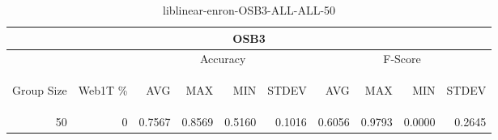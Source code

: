 \begin{center}
\begin{table}[htbp]
\begin{tabular}{ | r | r | r | r | r | r | r | r | r | r |}
\hline
\multicolumn{10}{|c|}{OSB3}\\
\hline
 & & \multicolumn{4}{|c|}{Accuracy} & \multicolumn{4}{|c|}{F-Score}\\ \cline{3-10}
\begin{sideways}Group Size\end{sideways} & \begin{sideways}Web1T \%\end{sideways} & \begin{sideways}AVG\end{sideways} & \begin{sideways}MAX\end{sideways} & \begin{sideways}MIN\end{sideways} & \begin{sideways}STDEV\end{sideways} & \begin{sideways}AVG\end{sideways} & \begin{sideways}MAX\end{sideways} & \begin{sideways}MIN\end{sideways} & \begin{sideways}STDEV\end{sideways}\\
\hline
\multirow{0}{*}{50}
 & 0 & 0.7567 & 0.8569 & 0.5160 & 0.1016 & 0.6056 & 0.9793 & 0.0000 & 0.2645\\ \cline{2-10}
\hline
\end{tabular}
\caption{liblinear-enron-OSB3-ALL-ALL-50}
\label{table:liblinear-enron-OSB3-ALL-ALL-50}
\end{table}
\end{center}

